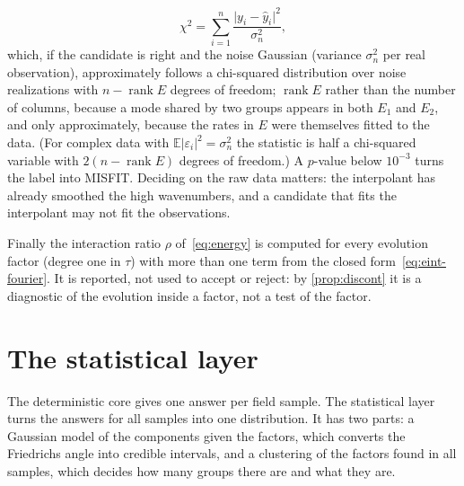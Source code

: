 \documentclass[11pt]{article}
\theoremstyle{plain}
\theoremstyle{definition}
\theoremstyle{remark}
\DeclareMathOperator{\rank}{rank}
\newcommand{\noise}{\sigma_{n}}             %
\newcommand{\lab}[1]{\textsf{#1}}           %
\newcommand{\MIS}{\lab{MISFIT}}
\newcommand{\abs}[1]{\lvert#1\rvert}
\begin{document}
\[
  \chi^2=\sum_{i=1}^{n}\frac{\abs{y_i-\hat y_i}^2}{\noise^2},
\]
which, if the candidate is right and the noise Gaussian (variance $\noise^2$ per real observation), approximately follows
a chi-squared distribution over noise realizations with $n-\rank E$ degrees of freedom; $\rank E$ rather than the number of
columns, because a mode shared by two groups appears in both $E_1$ and $E_2$, and only approximately, because the rates in
$E$ were themselves fitted to the data. (For complex data with $\mathbb E\abs{\varepsilon_i}^2=\noise^2$ the statistic is half
a chi-squared variable with $2(n-\rank E)$ degrees of freedom.) A $p$-value below $10^{-3}$
turns the label into \MIS. Deciding on the raw data matters:
the interpolant has already smoothed the high wavenumbers, and a candidate that fits the interpolant may
not fit the observations.

Finally the interaction ratio $\rho$ of~\eqref{eq:energy} is computed for every evolution factor (degree one in $\tau$) with more than one
term from the closed form~\eqref{eq:eint-fourier}. It is reported, not used to accept or reject: by
\cref{prop:discont} it is a diagnostic of the evolution inside a factor, not a test of the factor.



\section{The statistical layer}\label{sec:bayesian}
The deterministic core gives one answer per field sample. The statistical layer turns the answers for all samples
into one distribution. It has two parts: a Gaussian model of the components given the factors, which converts the
Friedrichs angle into credible intervals, and a clustering of the factors found in all samples, which decides how
many groups there are and what they are.

\end{document}
